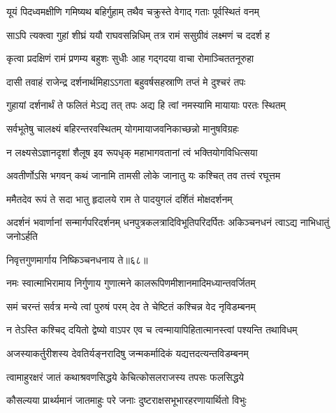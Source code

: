 


\addtocounter{shlokacount}{57}

\twolineshloka
{यूयं पिदध्वमक्षीणि गमिष्यथ बहिर्गुहाम्}
{तथैव चक्रुस्ते वेगाद् गताः पूर्वस्थितं वनम्} %

\twolineshloka
{साऽपि त्यक्त्वा गुहां शीघ्रं ययौ राघवसन्निधिम्}
{तत्र रामं ससुग्रीवं लक्ष्मणं च ददर्श ह} %

\twolineshloka
{कृत्वा प्रदक्षिणं रामं प्रणम्य बहुशः सुधीः}
{आह गद्गदया वाचा रोमाञ्चिततनूरुहा} %

\twolineshloka
{दासी तवाहं राजेन्द्र दर्शनार्थमिहाऽऽगता}
{बहुवर्षसहस्राणि तप्तं मे दुश्चरं तपः} %

\twolineshloka
{गुहायां दर्शनार्थं ते फलितं मेऽद्य तत् तपः}
{अद्य हि त्वां नमस्यामि मायायाः परतः स्थितम्} %

\twolineshloka
{सर्वभूतेषु चालक्ष्यं बहिरन्तरवस्थितम्}
{योगमायाजवनिकाच्छन्नो मानुषविग्रहः} %

\twolineshloka
{न लक्ष्यसेऽज्ञानदृशां शैलूष इव रूपधृक्}
{महाभागवतानां त्वं भक्तियोगविधित्सया} %

\twolineshloka
{अवतीर्णोऽसि भगवन् कथं जानामि तामसी}
{लोके जानातु यः कश्चित् तव तत्त्वं रघूत्तम} %

\twolineshloka
{ममैतदेव रूपं ते सदा भातु हृदालये}
{राम ते पादयुगलं दर्शितं मोक्षदर्शनम्} %

\threelineshloka
{अदर्शनं भवार्णानां सन्मार्गपरिदर्शनम्}
{धनपुत्रकलत्रादिविभूतिपरिदर्पितः}
{अकिञ्चनधनं त्वाऽद्य नाभिधातुं जनोऽर्हति} %

\onelineshloka
{निवृत्तगुणमार्गाय निष्किञ्चनधनाय ते॥६८॥} %

\twolineshloka
{नमः स्वात्माभिरामाय निर्गुणाय गुणात्मने}
{कालरूपिणमीशानमादिमध्यान्तवर्जितम्} %

\twolineshloka
{समं चरन्तं सर्वत्र मन्ये त्वां पुरुषं परम्}
{देव ते चेष्टितं कश्चिन्न वेद नृविडम्बनम्} %

\twolineshloka
{न तेऽस्ति कश्चिद् दयितो द्वेष्यो वाऽपर एव च}
{त्वन्मायापिहितात्मानस्त्वां पश्यन्ति तथाविधम्} %

\twolineshloka
{अजस्याकर्तुरीशस्य देवतिर्यङ्नरादिषु}
{जन्मकर्मादिकं यद्यत्तदत्यन्तविडम्बनम्} %

\twolineshloka
{त्वामाहुरक्षरं जातं कथाश्रवणसिद्धये}
{केचित्कोसलराजस्य तपसः फलसिद्धये} %

\twolineshloka
{कौसल्यया प्रार्थ्यमानं जातमाहुः परे जनाः}
{दुष्टराक्षसभूभारहरणायार्थितो विभुः} %

